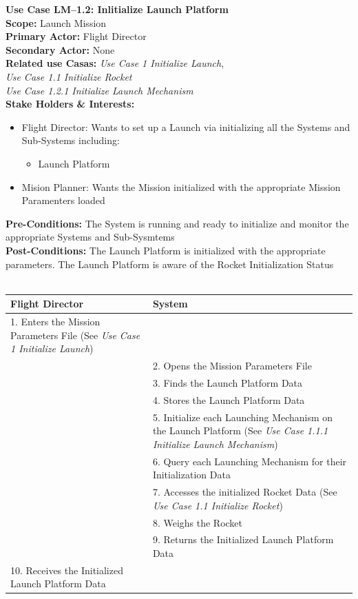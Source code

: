 \documentclass[letterpaper]{article}
\begin{document}
\noindent
\textbf{Use Case LM--1.2:  Inlitialize Launch Platform}\\
\textbf{Scope: }Launch Mission\\
\textbf{Primary Actor:  }Flight Director\\
\textbf{Secondary Actor:  }None\\
\textbf{Related use Casas: }\textit{Use Case 1 Initialize Launch},\\
\textit{Use Case 1.1 Initialize Rocket}\\
\textit{Use Case 1.2.1 Initialize Launch Mechanism}\\
\textbf{Stake Holders \& Interests:}
\begin{itemize}
   \item Flight Director:  Wants to set up a Launch via initializing
      all the Systems and Sub-Systems including:
      \begin{itemize}
         \item Launch Platform
      \end{itemize}
   \item Mision Planner:  Wants the Mission initialized with the
      appropriate Mission Paramenters loaded
\end{itemize}
\textbf{Pre-Conditions:  }The System is running and ready to
initialize and monitor the appropriate Systems and Sub-Sysmtems\\
\textbf{Post-Conditions: }The Launch Platform is initialized with the
appropriate parameters.  The Launch Platform is aware of the Rocket
Initialization Status\\\\
\begin{tabular}{|p{5.75cm}|p{5.75cm}|}\hline
   \textbf{Flight Director}&\textbf{System}\\\hline
   1. Enters the Mission Parameters File (See \textit{Use Case 1
   Initialize Launch})&\\\hline
   &2. Opens the Mission Parameters File\\\hline
   &3. Finds the Launch Platform Data\\\hline
   &4. Stores the Launch Platform Data\\\hline
   &5. Initialize each Launching Mechanism on the Launch Platform
   (See \textit{Use Case 1.1.1 Initialize Launch Mechanism})\\\hline
   &6. Query each Launching Mechanism for their Initialization 
   Data\\\hline
   &7. Accesses the initialized Rocket Data (See \textit{Use Case
   1.1 Initialize Rocket})\\\hline
   &8. Weighs the Rocket\\\hline
   &9. Returns the Initialized Launch Platform Data\\\hline
   10. Receives the Initialized Launch Platform Data&\\\hline
\end{tabular}\\\\
\end{document}
